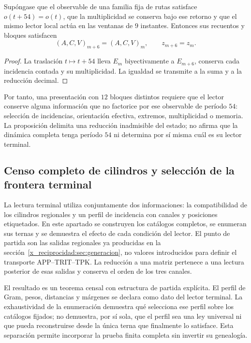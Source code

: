 \begin{proposition}
Supóngase que el observable de una familia fija de rutas satisface
\(o(t+54)=o(t)\), que la multiplicidad se conserva bajo ese retorno
y que el mismo lector local actúa en las ventanas de \(9\) instantes.
Entonces sus recuentos y bloques satisfacen
\[
 (A,C,V)_{m+6}=(A,C,V)_m,\qquad z_{m+6}=z_m.
\]
\end{proposition}

\begin{proof}
La traslación \(t\mapsto t+54\) lleva \(E_m\) biyectivamente
a \(E_{m+6}\), conserva cada incidencia contada y su multiplicidad.
La igualdad se transmite a la suma y a la reducción decimal.
\end{proof}

Por tanto, una presentación con \(12\) bloques distintos requiere que
el lector conserve alguna información que no factorice por ese observable
de período \(54\): selección de incidencias, orientación efectiva,
extremos, multiplicidad o memoria. La proposición delimita una reducción
inadmisible del estado; no afirma que la dinámica completa tenga
período \(54\) ni determina por sí misma cuál es su lector terminal.



\subsection{Censo completo de cilindros y selección de la frontera terminal}
\label{x_reciprocidad:censo:terminal-completo}

La lectura terminal utiliza conjuntamente dos informaciones: la compatibilidad
de los cilindros regionales y un perfil de incidencia con canales y posiciones
etiquetados. En este apartado se construyen los catálogos completos, se
enumeran sus ternas y se demuestra el efecto de cada condición del lector.
El punto de partida son las salidas regionales ya producidas en la
sección~\ref{x_reciprocidad:sec:generacion}, no valores introducidos para definir el
transporte APP--TRIT--TPK. La reducción a una matriz pertenece a una lectura
posterior de esas salidas y conserva el orden de los tres canales.

El resultado es un teorema censal con estructura de partida explícita.
El perfil de Gram, pesos, distancias y márgenes se declara como dato del
lector terminal. La exhaustividad de la enumeración demuestra qué selecciona
ese perfil sobre los catálogos fijados; no demuestra, por sí sola, que el
perfil sea una ley universal ni que pueda reconstruirse desde la única terna
que finalmente lo satisface. Esta separación permite incorporar la prueba
finita completa sin invertir su genealogía.

